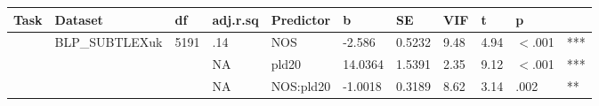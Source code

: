 \begin{table}[ht]
\centering
\begingroup\normalsize
\begin{tabular}{lllllllllll}
  \hline
Task & Dataset & df & adj.r.sq & Predictor & b & SE & VIF & t & p &  \\ 
  \hline
 & BLP\_SUBTLEXuk & 5191 & .14 & NOS & -2.586 & 0.5232 & 9.48 & 4.94 & $<$.001 & *** \\ 
   &  &  & NA & pld20 & 14.0364 & 1.5391 & 2.35 & 9.12 & $<$.001 & *** \\ 
   &  &  & NA & NOS:pld20 & -1.0018 & 0.3189 & 8.62 & 3.14 & .002 & ** \\ 
   \hline
\end{tabular}
\endgroup
\end{table}
